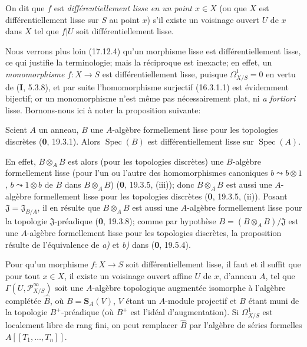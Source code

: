 On dit que $f$ est \emph{différentiellement lisse en un point $x\in X$} (ou
que $X$ est différentiellement lisse sur $S$ au point $x$) s'il existe un
voisinage ouvert $U$ de $x$ dans $X$ tel que $f|U$ soit différentiellement
lisse.

Nous verrons plus loin (17.12.4) qu'un morphisme lisse est différentiellement
lisse, ce qui justifie la terminologie; mais la réciproque est inexacte; en
effet, un \emph{monomorphisme} $f:X\to S$ est différentiellement lisse,
puisque $\varOmega_{X/S}^1=0$ en vertu de (\textbf{I}, 5.3.8), et par suite
l'homomorphisme surjectif (16.3.1.1) est évidemment bijectif; or un
monomorphisme n'est même pas nécessairement plat, ni \emph{a fortiori} lisse.
Bornons-nous ici à noter la proposition suivante:

\begin{proposition}[16.10.2]
\label{IV.16.10.2}
Scient $A$ un anneau, $B$ une $A$-algèbre formellement lisse pour les
topologies discrètes \textup{(\textbf{0}, 19.3.1)}. Alors $\operatorname{Spec}(B)$ est
différentiellement lisse sur $\operatorname{Spec}(A)$.
\end{proposition}

En effet, $B\otimes_A B$ est alors (pour les topologies discrètes) une
$B$-algèbre formellement lisse (pour l'un ou l'autre des homomorphismes
canoniques $b\leadsto b\otimes1$, $b\leadsto1\otimes b$ de $B$
dans $B\otimes_A B$) (\textbf{0}, 19.3.5, (iii)); donc $B\otimes_A B$ est aussi une
$A$-algèbre formellement lisse pour les topologies discrètes (\textbf{0}, 19.3.5,
(ii)). Posant $\mathfrak{J}=\mathfrak{J}_{B/A}$, il en résulte que
$B\otimes_A B$ est aussi une $A$-algèbre formellement lisse pour la topologie
$\mathfrak{J}$-préadique (\textbf{0}, 19.3.8); comme par hypothèse
$B=(B\otimes_A B)/\mathfrak{J}$ est une $A$-algèbre formellement lisse pour
les topologies discrètes, la proposition résulte de l'équivalence de \emph{a)} et \emph{b)}
dans (\textbf{0}, 19.5.4).

\begin{proposition}[16.10.3]
\label{IV.16.10.3}
Pour qu'un morphisme $f:X\to S$ soit différentiellement lisse, il faut et il
suffit que pour tout $x\in X$, il existe un voisinage ouvert affine $U$ de
$x$, d'anneau $A$, tel que $\Gamma(U,\mathscr{P}_{X/S}^{\infty})$ soit une
$A$-algèbre topologique augmentée isomorphe à l'algèbre complétée $\widehat B$,
où $B=\mathbf{S}_A(V)$, $V$ étant un $A$-module projectif et $B$ étant muni de
la topologie $B^+$-préadique (où $B^+$ est l'idéal d'augmentation). Si
$\varOmega_{X/S}^1$ est localement libre de rang fini, on peut remplacer
$\widehat B$ par l'algèbre de séries formelles $A[[T_1,\ldots,T_n]]$.
\end{proposition}

